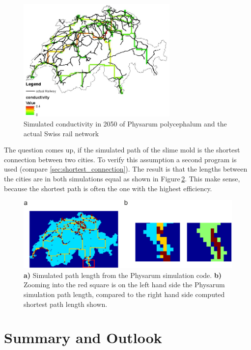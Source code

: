 \documentclass[11pt]{scrartcl}
\begin{document}
\begin{figure}[H]
	\centering
	\includegraphics[width=0.7\textwidth]{figures/conductivity_railway_2050}
	\caption{Simulated conductivity in 2050 of Physarum polycephalum and the actual Swiss rail network}
	\label{fig:conductivity_2050}
\end{figure}

The question comes up, if the simulated path of the slime mold is the shortest connection between two cities. To verify this assumption a second program is used (compare \ref{sec:shortest_connection}). The result is that the lengths between the cities are in both simulations equal as shown in Figure\,\ref{fig:short}. This make sense, because the shortest path is often the one with the highest efficiency.

\begin{figure}[H]
	\centering
	\includegraphics[width=12cm]{figures/figure3}
	\caption{\textbf{a)} Simulated path length from the Physarum simulation code. \textbf{b)} Zooming into the red square is on the left hand side the Physarum simulation path length, compared to the right hand side computed shortest path length shown.}
	\label{fig:short}
\end{figure}
\label{sec:matlab}


\section{Summary and Outlook}
\label{sec:summary}
\end{document}
